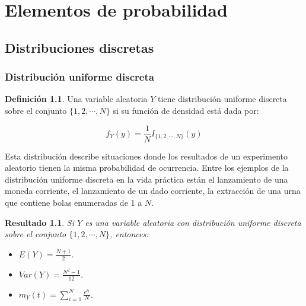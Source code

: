\documentclass[
  10pt,
  spanish,
]{book}
\providecommand{\tightlist}{%
  \setlength{\itemsep}{0pt}\setlength{\parskip}{0pt}}
\newtheorem{proposition}{Resultado}[chapter]
\theoremstyle{definition}
\newtheorem{definition}{Definición}[chapter]
\theoremstyle{definition}
\theoremstyle{definition}
\theoremstyle{definition}
\theoremstyle{remark}
\begin{document}
\hypertarget{elementos-de-probabilidad}{%
\chapter{Elementos de probabilidad}\label{elementos-de-probabilidad}}

\hypertarget{distribuciones-discretas}{%
\section{Distribuciones discretas}\label{distribuciones-discretas}}

\hypertarget{distribuciuxf3n-uniforme-discreta}{%
\subsection{Distribución uniforme discreta}\label{distribuciuxf3n-uniforme-discreta}}

\begin{definition}
\protect\hypertarget{def:unnamed-chunk-1}{}{\label{def:unnamed-chunk-1} }Una variable aleatoria \(Y\) tiene distribución uniforme discreta sobre el conjunto \(\{1,2,\cdots,N\}\) si su función de densidad está dada por:

\begin{equation}
f_Y(y)=\frac{1}{N}I_{\{1,2,\cdots,N\}}(y)
\end{equation}
\end{definition}

Esta distribución describe situaciones donde los resultados de un experimento aleatorio tienen la misma probabilidad de ocurrencia. Entre los ejemplos de la distribución uniforme discreta en la vida práctica están el lanzamiento de una moneda corriente, el lanzamiento de un dado corriente, la extracción de una urna que contiene bolas enumeradas de 1 a \(N\).

\begin{proposition}
\protect\hypertarget{prp:unnamed-chunk-2}{}{\label{prp:unnamed-chunk-2} }Si \(Y\) es una variable aleatoria con distribución uniforme discreta sobre el conjunto \(\{1,2,\cdots,N\}\), entonces:

\begin{itemize}
\tightlist
\item
  \(E(Y)=\frac{N+1}{2}\).
\item
  \(Var(Y)=\frac{N^2-1}{12}\).
\item
  \(m_Y(t)=\sum_{i=1}^N\frac{e^{ti}}{N}\).
\end{itemize}
\end{proposition}
\end{document}
